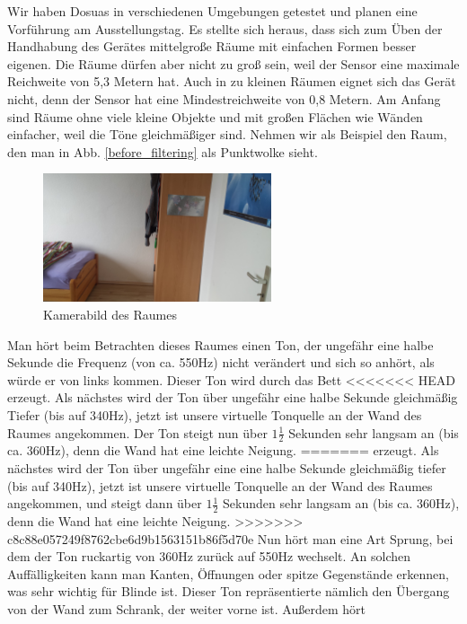 \documentclass[a4paper,12pt,ngerman]{scrartcl}
\begin{document}
Wir haben Dosuas in verschiedenen Umgebungen getestet und planen eine Vorführung am Ausstellungstag.
Es stellte sich heraus, dass sich zum Üben der Handhabung des Gerätes mittelgroße Räume mit einfachen
Formen besser eigenen. Die Räume dürfen aber nicht zu groß sein, weil der Sensor eine maximale Reichweite
von 5,3 Metern hat. Auch in zu kleinen Räumen eignet sich das Gerät nicht, denn der Sensor hat eine  Mindestreichweite von 0,8 Metern. Am Anfang sind Räume ohne viele kleine Objekte und mit großen 
Flächen wie Wänden einfacher, weil die Töne gleichmäßiger sind.
Nehmen wir als Beispiel den Raum, den man in Abb. \ref{before_filtering} als Punktwolke sieht. 
\begin{figure}[h]
	\centering
	\includegraphics[angle=180,width=0.6\textwidth]{20180120_114953}
	\caption{Kamerabild des Raumes}
	\label{normal_picture}
\end{figure} \par
Man hört beim Betrachten dieses Raumes einen Ton, der ungefähr eine halbe Sekunde die Frequenz (von ca. 550Hz) nicht verändert und sich so anhört, als würde er von links kommen. Dieser Ton wird durch das Bett
<<<<<<< HEAD
erzeugt. Als nächstes wird der Ton über ungefähr eine halbe Sekunde gleichmäßig Tiefer (bis auf 340Hz), 
jetzt ist unsere virtuelle Tonquelle an der Wand des Raumes angekommen. Der Ton steigt nun über $1\frac{1}{2}$ Sekunden sehr langsam an (bis ca. 360Hz), denn die Wand hat eine leichte Neigung. 
=======
erzeugt. Als nächstes wird der Ton über ungefähr eine eine halbe Sekunde gleichmäßig tiefer (bis auf 340Hz), 
jetzt ist unsere virtuelle Tonquelle an der Wand des Raumes angekommen, und steigt dann über $1\frac{1}{2}$ Sekunden sehr langsam an (bis ca. 360Hz), denn die Wand hat eine leichte Neigung. 
>>>>>>> c8c88e057249f8762cbe6d9b1563151b86f5d70e
Nun hört man eine Art Sprung, bei dem der Ton ruckartig von 360Hz zurück auf 550Hz wechselt. An solchen Auffälligkeiten kann man Kanten, Öffnungen oder spitze Gegenstände erkennen, was sehr wichtig für Blinde
ist. Dieser Ton repräsentierte nämlich den Übergang von der Wand zum Schrank, der weiter vorne ist. Außerdem hört
\end{document}
